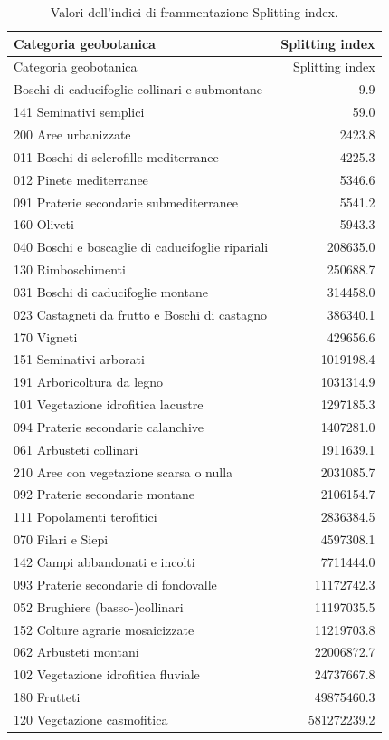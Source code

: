 \documentclass[
  a4paper,
]{book}
\begin{document}
\begin{longtable}[]{@{}lr@{}}
\caption{\label{tab:SIAll} Valori dell'indici di frammentazione Splitting index.}\tabularnewline
\toprule\noalign{}
Categoria geobotanica & Splitting index \\
\midrule\noalign{}
\endfirsthead
\toprule\noalign{}
Categoria geobotanica & Splitting index \\
\midrule\noalign{}
\endhead
\bottomrule\noalign{}
\endlastfoot
022 Boschi di caducifoglie collinari e submontane & 9.9 \\
141 Seminativi semplici & 59.0 \\
200 Aree urbanizzate & 2423.8 \\
011 Boschi di sclerofille mediterranee & 4225.3 \\
012 Pinete mediterranee & 5346.6 \\
091 Praterie secondarie submediterranee & 5541.2 \\
160 Oliveti & 5943.3 \\
040 Boschi e boscaglie di caducifoglie ripariali & 208635.0 \\
130 Rimboschimenti & 250688.7 \\
031 Boschi di caducifoglie montane & 314458.0 \\
023 Castagneti da frutto e Boschi di castagno & 386340.1 \\
170 Vigneti & 429656.6 \\
151 Seminativi arborati & 1019198.4 \\
191 Arboricoltura da legno & 1031314.9 \\
101 Vegetazione idrofitica lacustre & 1297185.3 \\
094 Praterie secondarie calanchive & 1407281.0 \\
061 Arbusteti collinari & 1911639.1 \\
210 Aree con vegetazione scarsa o nulla & 2031085.7 \\
092 Praterie secondarie montane & 2106154.7 \\
111 Popolamenti terofitici & 2836384.5 \\
070 Filari e Siepi & 4597308.1 \\
142 Campi abbandonati e incolti & 7711444.0 \\
093 Praterie secondarie di fondovalle & 11172742.3 \\
052 Brughiere (basso-)collinari & 11197035.5 \\
152 Colture agrarie mosaicizzate & 11219703.8 \\
062 Arbusteti montani & 22006872.7 \\
102 Vegetazione idrofitica fluviale & 24737667.8 \\
180 Frutteti & 49875460.3 \\
120 Vegetazione casmofitica & 581272239.2 \\
\end{longtable}
\end{document}
